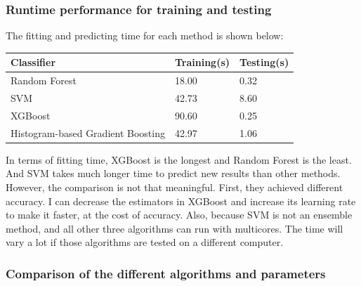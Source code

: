 \documentclass[12pt]{article}
\begin{document}
\subsubsection{Runtime performance for training and testing}

The fitting and predicting time for each method is shown below:
\begin{center}
\begin{tabular}{|p{7cm}|p{2.5cm}|p{2.5cm}|}
\hline
\textbf{Classifier} & \textbf{Training(s)} & \textbf{Testing(s)}\\ 
\hline
Random Forest & 18.00 & 0.32\\ 
\hline
SVM & 42.73 & 8.60\\
\hline
XGBoost & 90.60 & 0.25\\
\hline
Histogram-based Gradient Boosting & 42.97 & 1.06\\
\hline
\end{tabular}
\end{center}
In terms of fitting time, XGBoost is the longest and Random Forest is the least. And SVM takes much longer time to predict new results than other methods. However, the comparison is not that meaningful. First, they achieved different accuracy. I can decrease the estimators in XGBoost and increase its learning rate to make it faster, at the cost of accuracy. Also, because SVM is not an ensemble method, and all other three algorithms can run with multicores. The time will vary a lot if those algorithms are tested on a different computer.

\subsubsection{Comparison of the different algorithms and parameters}
\end{document}
